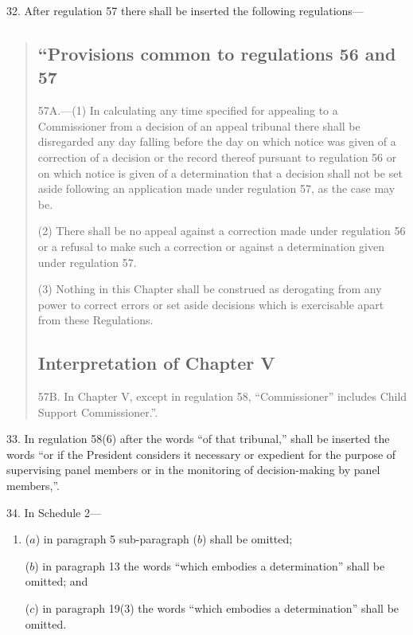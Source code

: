 \documentclass[12pt,a4paper]{article}
\begin{document}
32.  After regulation 57 there shall be inserted the following regulations—
\begin{quotation}
\subsection*{“Provisions common to regulations 56 and 57}

57A.---(1)  In calculating any time specified for appealing to a Commissioner from a decision of an appeal tribunal there shall be disregarded any day falling before the day on which notice was given of a correction of a decision or the record thereof pursuant to regulation 56 or on which notice is given of a determination that a decision shall not be set aside following an application made under regulation 57, as the case may be.

(2) There shall be no appeal against a correction made under regulation 56 or a refusal to make such a correction or against a determination given under regulation 57.

(3) Nothing in this Chapter shall be construed as derogating from any power to correct errors or set aside decisions which is exercisable apart from these Regulations.

\subsection*{Interpretation of Chapter V}

57B.  In Chapter V, except in regulation 58, “Commissioner” includes Child Support Commissioner.”.
\end{quotation}

\medskip

33.  In regulation 58(6) after the words “of that tribunal,” shall be inserted the words “or if the President considers it necessary or expedient for the purpose of supervising panel members or in the monitoring of decision-making by panel members,”.

\medskip

34.  In Schedule 2—
\begin{enumerate}\item[]
($a$) in paragraph 5 sub-paragraph ($b$)  shall be omitted;

($b$) in paragraph 13 the words “which embodies a determination” shall be omitted; and

($c$) in paragraph 19(3) the words “which embodies a determination” shall be omitted.
\end{enumerate}
\end{document}

